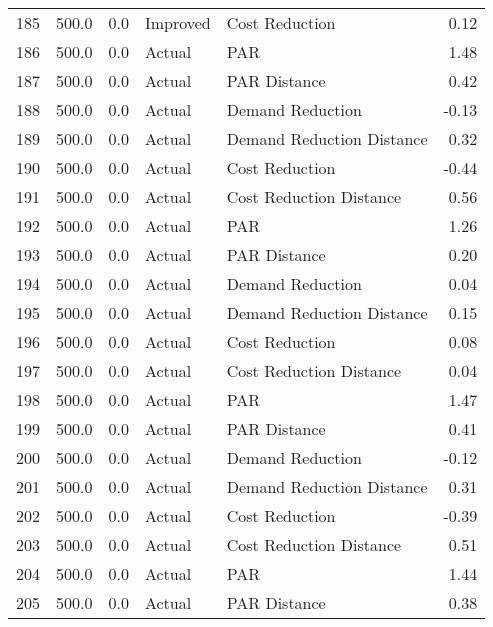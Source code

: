 \begin{longtable}{lrrllr}
185  &        500.0 &     0.0 &       Improved &             Cost Reduction &   0.12 \\
186  &        500.0 &     0.0 &         Actual &                        PAR &   1.48 \\
187  &        500.0 &     0.0 &         Actual &               PAR Distance &   0.42 \\
188  &        500.0 &     0.0 &         Actual &           Demand Reduction &  -0.13 \\
189  &        500.0 &     0.0 &         Actual &  Demand Reduction Distance &   0.32 \\
190  &        500.0 &     0.0 &         Actual &             Cost Reduction &  -0.44 \\
191  &        500.0 &     0.0 &         Actual &    Cost Reduction Distance &   0.56 \\
192  &        500.0 &     0.0 &         Actual &                        PAR &   1.26 \\
193  &        500.0 &     0.0 &         Actual &               PAR Distance &   0.20 \\
194  &        500.0 &     0.0 &         Actual &           Demand Reduction &   0.04 \\
195  &        500.0 &     0.0 &         Actual &  Demand Reduction Distance &   0.15 \\
196  &        500.0 &     0.0 &         Actual &             Cost Reduction &   0.08 \\
197  &        500.0 &     0.0 &         Actual &    Cost Reduction Distance &   0.04 \\
198  &        500.0 &     0.0 &         Actual &                        PAR &   1.47 \\
199  &        500.0 &     0.0 &         Actual &               PAR Distance &   0.41 \\
200  &        500.0 &     0.0 &         Actual &           Demand Reduction &  -0.12 \\
201  &        500.0 &     0.0 &         Actual &  Demand Reduction Distance &   0.31 \\
202  &        500.0 &     0.0 &         Actual &             Cost Reduction &  -0.39 \\
203  &        500.0 &     0.0 &         Actual &    Cost Reduction Distance &   0.51 \\
204  &        500.0 &     0.0 &         Actual &                        PAR &   1.44 \\
205  &        500.0 &     0.0 &         Actual &               PAR Distance &   0.38 \\

\end{longtable}
